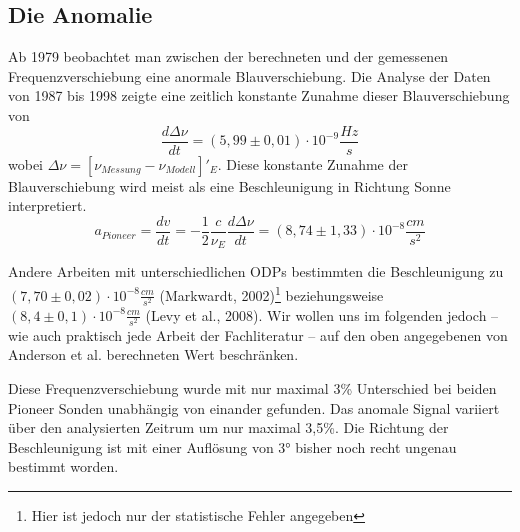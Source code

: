 \documentclass[a4paper,10pt]{article}
\newcommand{\rem}[1]{}
\begin{document}
\subsection{Die Anomalie}
Ab 1979 beobachtet man zwischen der berechneten und der gemessenen Frequenzverschiebung eine anormale Blauverschiebung.
Die Analyse der Daten von 1987 bis 1998 zeigte eine zeitlich konstante Zunahme dieser Blauverschiebung von
\begin{equation}
  \frac{d\Delta\nu}{dt}=(5,99\pm0,01)\cdot10^{-9}\frac{Hz}{s}
\end{equation}
wobei $\Delta\nu=[\nu_{Messung}-\nu_{Modell}]'_E$. Diese konstante Zunahme der Blauverschiebung wird meist als eine
Beschleunigung in Richtung Sonne interpretiert.
\begin{equation}
  a_{Pioneer}=\frac{dv}{dt}=-\frac{1}{2}\frac{c}{\nu_E}\frac{d\Delta\nu}{dt} = (8,74\pm1,33)\cdot10^{-8}\frac{cm}{s^2}
\end{equation}
\rem{
oder
\begin{equation}
  \Delta\nu=-\nu_E \frac{2a_p t}{c}
\end{equation}
}
Andere Arbeiten mit unterschiedlichen ODPs bestimmten die Beschleunigung zu $(7,70
\pm0,02)\cdot10^{-8}\frac{cm}{s^2}$ (Markwardt,
2002)\footnote{Hier ist jedoch nur der statistische Fehler angegeben}\cite{Markwardt2002} beziehungsweise
$(8,4\pm0,1)\cdot10^{-8}\frac{cm}{s^2}$ (Levy et al., 2008)\cite{Levy2008}.
Wir wollen uns im folgenden jedoch – wie auch praktisch jede Arbeit der Fachliteratur – auf den oben angegebenen von
Anderson et al. berechneten Wert beschränken.

Diese Frequenzverschiebung wurde mit nur maximal 3\% Unterschied bei beiden Pioneer Sonden unabhängig von einander
gefunden. Das anomale Signal variiert über den analysierten Zeitrum um nur maximal 3,5\%. Die Richtung der
Beschleunigung ist mit einer Auflösung von 3° bisher noch recht ungenau bestimmt worden.





{}

\end{document}

